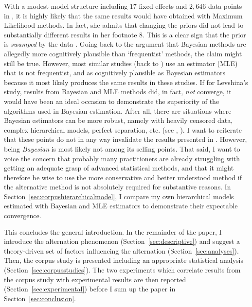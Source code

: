 \documentclass[USenglish]{article}
\begin{document}
With a modest model structure including $17$ fixed effects and $2,646$ data points in \cite{Levshina2016}, it is highly likely that the same results would have obtained with Maximum Likelihood methods.
In fact, she admits that changing the priors did not lead to substantially different results in her footnote 8.
This is a clear sign that the prior is \textit{swamped} by the data \citep[1119]{Freedman1999}.
Going back to the argument that Bayesian methods are allegedly more cognitively plausible than `frequentist' methods, the claim might still be true.
However, most similar studies (back to \citealp{BresnanEa2007}) use an estimator (MLE) that is not frequentist, and as cognitively plausible as Bayesian estimators because it most likely produces the same results in these studies.
If for Levshina's study, results from Bayesian and MLE methods did, in fact, \textit{not} converge, it would have been an ideal occasion to demonstrate the superiority of the algorithms used in Bayesian estimation.
After all, there are situations where Bayesian estimators can be more robust, namely with heavily censored data, complex hierarchical models, perfect separation, etc. (see \citealp{Freedman1999}, \citealp[345--348]{GelmanHill2006}).
I want to reiterate that these points do not in any way invalidate the results presented in \cite{Levshina2016}.
However, being \textit{Bayesian} is most likely not among its selling points.
That said, I want to voice the concern that probably many practitioners are already struggling with getting an adequate grasp of advanced statistical methods, and that it might therefore be wise to use the more conservative and better understood method if the alternative method is not absolutely required for substantive reasons.
In Section~\ref{sec:corpushierarchicalmodel}, I compare my own hierarchical models estimated with Bayesian and MLE estimators to demonstrate their expectable convergence.

This concludes the general introduction.
In the remainder of the paper, I introduce the alternation phenomenon (Section~\ref{sec:descriptive}) and suggest a theory-driven set of factors influencing the alternation (Section~\ref{sec:analyses}).
Then, the corpus study is presented including an appropriate statistical analysis (Section~\ref{sec:corpusstudies}).
The two experiments which correlate results from the corpus study with experimental results are then reported (Section~\ref{sec:experimental}) before I sum up the paper in Section~\ref{sec:conclusion}.


\end{document}
